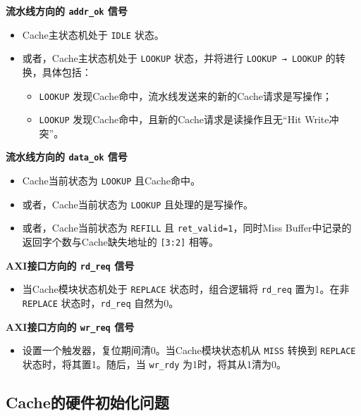 \textbf{流水线方向的 \texttt{addr\_ok} 信号}

\begin{itemize}
\tightlist
\item
  Cache主状态机处于 \texttt{IDLE} 状态。
\item
  或者，Cache主状态机处于 \texttt{LOOKUP} 状态，并将进行 \texttt{LOOKUP\ →\ LOOKUP} 的转换，具体包括：

  \begin{itemize}
  \tightlist
  \item
    \texttt{LOOKUP} 发现Cache命中，流水线发送来的新的Cache请求是写操作；
  \item
    \texttt{LOOKUP} 发现Cache命中，且新的Cache请求是读操作且无``Hit Write冲突''。
  \end{itemize}
\end{itemize}

\textbf{流水线方向的 \texttt{data\_ok} 信号}

\begin{itemize}
\tightlist
\item
  Cache当前状态为 \texttt{LOOKUP} 且Cache命中。
\item
  或者，Cache当前状态为 \texttt{LOOKUP} 且处理的是写操作。
\item
  或者，Cache当前状态为 \texttt{REFILL} 且 \texttt{ret\_valid=1}，同时Miss Buffer中记录的返回字个数与Cache缺失地址的 \texttt{{[}3:2{]}} 相等。
\end{itemize}

\textbf{AXI接口方向的 \texttt{rd\_req} 信号}

\begin{itemize}
\tightlist
\item
  当Cache模块状态机处于 \texttt{REPLACE} 状态时，组合逻辑将 \texttt{rd\_req} 置为1。在非 \texttt{REPLACE} 状态时，\texttt{rd\_req} 自然为0。
\end{itemize}

\textbf{AXI接口方向的 \texttt{wr\_req} 信号}

\begin{itemize}
\tightlist
\item
  设置一个触发器，复位期间清0。当Cache模块状态机从 \texttt{MISS} 转换到 \texttt{REPLACE} 状态时，将其置1。随后，当 \texttt{wr\_rdy} 为1时，将其从1清为0。
\end{itemize}

\subsection{Cache的硬件初始化问题}\label{sec:09-cache-019}

